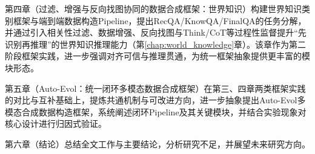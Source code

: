 第四章（过滤、增强与反向找图协同的数据合成框架：世界知识）构建世界知识类别框架与端到端数据构造Pipeline，提出RecQA/KnowQA/FinalQA的任务分解，并通过引入相关性过滤、数据增强、反向找图与Think/CoT等过程性监督提升“先识别再推理”的世界知识推理能力（第\ref{chap:world_knowledge}章）。该章作为第二阶段框架实践，进一步强调对齐可信与推理贯通，为统一框架抽象提供更丰富的模块形态。

第五章（Auto-Evol：统一闭环多模态数据合成框架）在第三、四章两类框架实践的对比与互补基础上，提炼共通机制与可改进方向，进一步抽象提出Auto-Evol多模态合成数据构造框架，系统阐述闭环Pipeline及其关键模块，并结合实验现象对核心设计进行归因式验证。

第六章（结论）总结全文工作与主要结论，分析研究不足，并展望未来研究方向。

